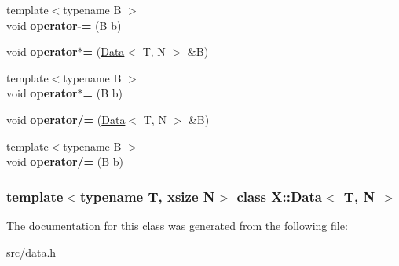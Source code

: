 \begin{DoxyCompactItemize}
\item 
\hypertarget{class_x_1_1_data_a153fccaadec2bf9da88caa7e31b8a3f5}{{\footnotesize template$<$typename B $>$ }\\void {\bfseries operator-\/=} (B b)}\label{class_x_1_1_data_a153fccaadec2bf9da88caa7e31b8a3f5}

\item 
\hypertarget{class_x_1_1_data_a837aad97f0179a95de5c768e19ce9272}{void {\bfseries operator$\ast$=} (\hyperlink{class_x_1_1_data}{Data}$<$ T, N $>$ \&B)}\label{class_x_1_1_data_a837aad97f0179a95de5c768e19ce9272}

\item 
\hypertarget{class_x_1_1_data_a3460e08914f4d7337ae106c291cf6818}{{\footnotesize template$<$typename B $>$ }\\void {\bfseries operator$\ast$=} (B b)}\label{class_x_1_1_data_a3460e08914f4d7337ae106c291cf6818}

\item 
\hypertarget{class_x_1_1_data_a3279d56933969537c5f12ff0a60c55a1}{void {\bfseries operator/=} (\hyperlink{class_x_1_1_data}{Data}$<$ T, N $>$ \&B)}\label{class_x_1_1_data_a3279d56933969537c5f12ff0a60c55a1}

\item 
\hypertarget{class_x_1_1_data_a78a26985cb6596c9d9e475f54887bbe3}{{\footnotesize template$<$typename B $>$ }\\void {\bfseries operator/=} (B b)}\label{class_x_1_1_data_a78a26985cb6596c9d9e475f54887bbe3}

\end{DoxyCompactItemize}
\subsubsection*{template$<$typename T, xsize N$>$ class X\-::\-Data$<$ T, N $>$}



The documentation for this class was generated from the following file\-:\begin{DoxyCompactItemize}
\item 
src/data.\-h\end{DoxyCompactItemize}
